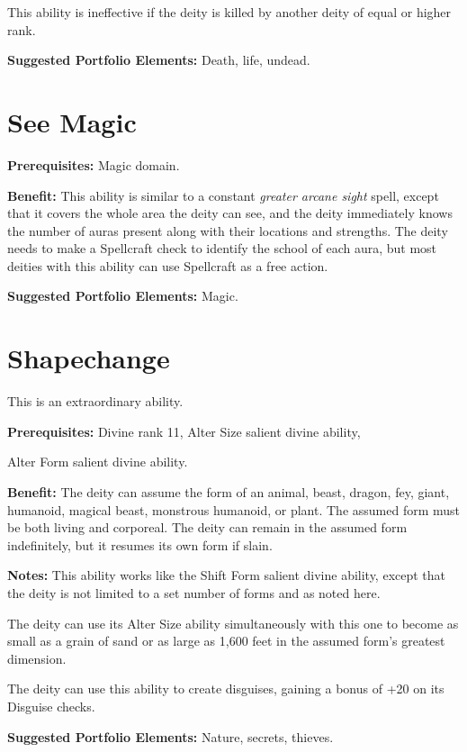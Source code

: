 \documentclass{article}
\begin{document}
This ability is ineffective if the deity is killed by another deity of equal or 
higher rank.

\textbf{Suggested Portfolio Elements:} Death, life, undead.

\vspace{12pt}
\section*{See Magic}

\textbf{Prerequisites:} Magic domain.

\textbf{Benefit:} This ability is similar to a constant \textit{greater arcane 
sight }spell, except that it covers the whole area the deity can see, and the deity 
immediately knows the number of auras present along with their locations and strengths. 
The deity needs to make a Spellcraft check to identify the school of each aura, 
but most deities with this ability can use Spellcraft as a free action.

\textbf{Suggested Portfolio Elements:} Magic.

\vspace{12pt}
\section*{Shapechange}

This is an extraordinary ability.

\textbf{Prerequisites:} Divine rank 11, Alter Size salient divine ability,

Alter Form salient divine ability.

\textbf{Benefit:} The deity can assume the form of an animal, beast, dragon, fey, 
giant, humanoid, magical beast, monstrous humanoid, or plant. The assumed form 
must be both living and corporeal. The deity can remain in the assumed form indefinitely, 
but it resumes its own form if slain.

\textbf{Notes:} This ability works like the Shift Form salient divine ability, 
except that the deity is not limited to a set number of forms and as noted here.

The deity can use its Alter Size ability simultaneously with this one to become 
as small as a grain of sand or as large as 1,600 feet in the assumed form's greatest 
dimension.

The deity can use this ability to create disguises, gaining a bonus of +20 on its 
Disguise checks.

\textbf{Suggested Portfolio Elements:} Nature, secrets, thieves.
\end{document}
